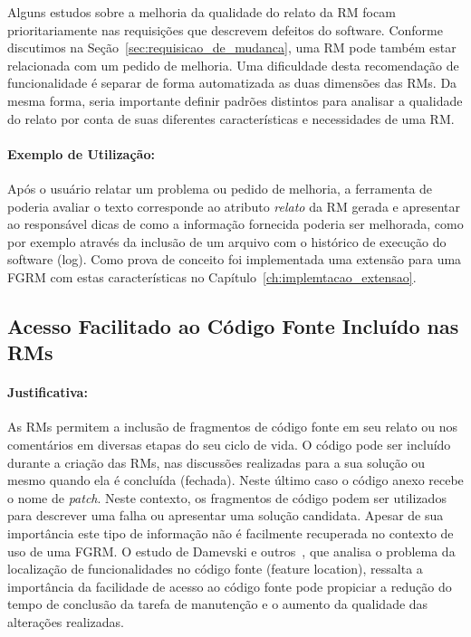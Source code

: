 Alguns estudos sobre a melhoria da qualidade do relato da RM focam
prioritariamente nas requisições que descrevem defeitos do software. Conforme
discutimos na Seção~\ref{sec:requisicao_de_mudanca}, uma RM pode também estar
relacionada com um pedido de melhoria. Uma dificuldade desta recomendação de
funcionalidade é separar de forma automatizada as duas dimensões das RMs. Da
mesma forma, seria importante definir padrões distintos para analisar a
qualidade do relato por conta de suas diferentes características e necessidades
de uma RM\@.

\paragraph{Exemplo de Utilização:}
\label{par:exemplo_s01}

Após o usuário relatar um problema ou pedido de melhoria, a ferramenta de
poderia avaliar o texto corresponde ao atributo \textit{relato} da RM gerada e
apresentar ao responsável dicas de como a informação fornecida poderia ser
melhorada, como por exemplo através da inclusão de um arquivo com o histórico de
execução do software (log). Como prova de conceito foi implementada uma extensão
para uma FGRM com estas características no
Capítulo~\ref{ch:implemtacao_extensao}.

\subsection{Acesso Facilitado ao Código Fonte Incluído nas RMs}
\label{sub:busca_por_código_fonte}


\paragraph{Justificativa:}
\label{par:justificativa_s02}

As RMs permitem a inclusão de fragmentos de código fonte em seu relato ou nos
comentários em diversas etapas do seu ciclo de vida. O código pode ser incluído
durante a criação das RMs, nas discussões realizadas para a sua solução ou mesmo
quando ela é concluída (fechada). Neste último caso o código anexo recebe o nome
de \textit{patch}. Neste contexto, os fragmentos de código podem ser utilizados
para descrever uma falha ou apresentar uma solução candidata. Apesar de sua
importância este tipo de informação não é facilmente recuperada no contexto de
uso de uma FGRM\@. O estudo de Damevski e outros~\cite{damevski2016field}, que
analisa o problema da localização de funcionalidades no código fonte (feature
location), ressalta a importância da facilidade de acesso ao código fonte pode
propiciar a redução do tempo de conclusão da tarefa de manutenção e o aumento da
qualidade das alterações realizadas.

